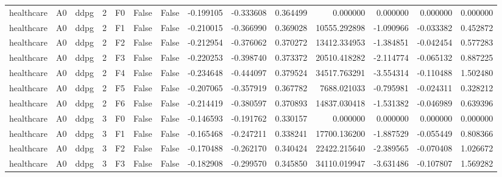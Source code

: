\begin{tabular}{lllrlllrrrrrrr}
healthcare &      A0 &      ddpg &     2 &  F0 &           False &            False & -0.199105 & -0.333608 & 0.364499 &         0.000000 &           0.000000 &        0.000000 &            0.000000 \\
healthcare &      A0 &      ddpg &     2 &  F1 &           False &            False & -0.210015 & -0.366990 & 0.369028 &     10555.292898 &          -1.090966 &       -0.033382 &            0.452872 \\
healthcare &      A0 &      ddpg &     2 &  F2 &           False &            False & -0.212954 & -0.376062 & 0.370272 &     13412.334953 &          -1.384851 &       -0.042454 &            0.577283 \\
healthcare &      A0 &      ddpg &     2 &  F3 &           False &            False & -0.220253 & -0.398740 & 0.373372 &     20510.418282 &          -2.114774 &       -0.065132 &            0.887225 \\
healthcare &      A0 &      ddpg &     2 &  F4 &           False &            False & -0.234648 & -0.444097 & 0.379524 &     34517.763291 &          -3.554314 &       -0.110488 &            1.502480 \\
healthcare &      A0 &      ddpg &     2 &  F5 &           False &            False & -0.207065 & -0.357919 & 0.367782 &      7688.021033 &          -0.795981 &       -0.024311 &            0.328212 \\
healthcare &      A0 &      ddpg &     2 &  F6 &           False &            False & -0.214419 & -0.380597 & 0.370893 &     14837.030418 &          -1.531382 &       -0.046989 &            0.639396 \\
healthcare &      A0 &      ddpg &     3 &  F0 &           False &            False & -0.146593 & -0.191762 & 0.330157 &         0.000000 &           0.000000 &        0.000000 &            0.000000 \\
healthcare &      A0 &      ddpg &     3 &  F1 &           False &            False & -0.165468 & -0.247211 & 0.338241 &     17700.136200 &          -1.887529 &       -0.055449 &            0.808366 \\
healthcare &      A0 &      ddpg &     3 &  F2 &           False &            False & -0.170488 & -0.262170 & 0.340424 &     22422.215640 &          -2.389565 &       -0.070408 &            1.026672 \\
healthcare &      A0 &      ddpg &     3 &  F3 &           False &            False & -0.182908 & -0.299570 & 0.345850 &     34110.019947 &          -3.631486 &       -0.107807 &            1.569282 \\

\end{tabular}
